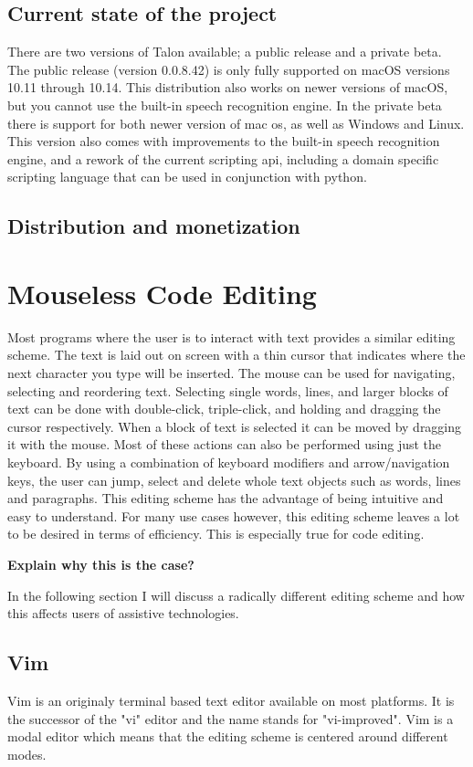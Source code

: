\documentclass[a4paper,english]{ifimaster}
\begin{document}
\subsection{Current state of the project}
There are two versions of Talon available; a public release and a private beta.
The public release (version 0.0.8.42) is only fully supported on macOS versions 10.11 through 10.14.
This distribution also works on newer versions of macOS, but you cannot use the built-in speech recognition engine.
In the private beta there is support for both newer version of mac os, as well as Windows and Linux.
This version also comes with improvements to the built-in speech recognition engine, and a rework of the current scripting api, including a domain specific scripting language that can be used in conjunction with python.

\subsection{Distribution and monetization}

\newpage
\section{Mouseless Code Editing}
Most programs where the user is to interact with text provides a similar editing scheme.
The text is laid out on screen with a thin cursor that indicates where the next character you type will be inserted.
The mouse can be used for navigating, selecting and reordering text.
Selecting single words, lines, and larger blocks of text can be done with double-click, triple-click, and holding and dragging the cursor respectively.
When a block of text is selected it can be moved by dragging it with the mouse.
Most of these actions can also be performed using just the keyboard.
By using a combination of keyboard modifiers and arrow/navigation keys, the user can jump, select and delete whole text objects such as words, lines and paragraphs.
This editing scheme has the advantage of being intuitive and easy to understand.
For many use cases however, this editing scheme leaves a lot to be desired in terms of efficiency.
This is especially true for code editing.

\textbf{Explain why this is the case?}

In the following section I will discuss a radically different editing scheme and how this affects users of assistive technologies.

\subsection{Vim}
Vim is an originaly terminal based text editor available on most platforms.
It is the successor of the "vi" editor and the name stands for "vi-improved".
Vim is a modal editor which means that the editing scheme is centered around different modes.
\end{document}
